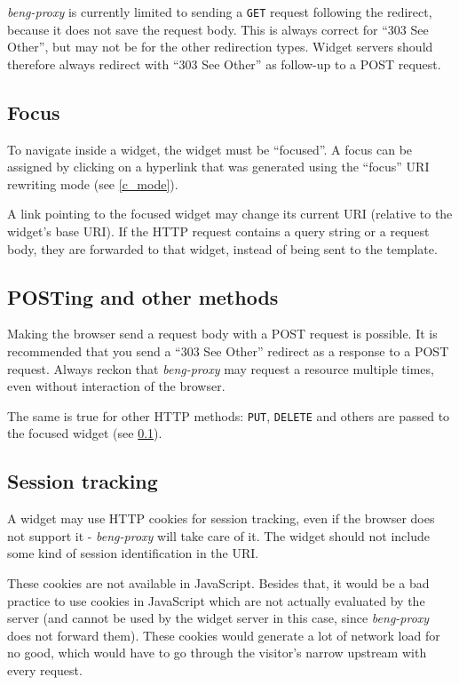 \documentclass[a4paper,12pt]{article}
\begin{document}
\emph{beng-proxy} is currently limited to sending a \texttt{GET}
request following the redirect, because it does not save the request
body.  This is always correct for ``303 See Other'', but may not be
for the other redirection types.  Widget servers should therefore
always redirect with ``303 See Other'' as follow-up to a POST request.

\subsection{Focus}
\label{focus}

To navigate inside a widget, the widget must be ``focused''.  A focus
can be assigned by clicking on a hyperlink that was generated using
the ``focus'' URI rewriting mode (see \ref{c_mode}).

A link pointing to the focused widget may change its current URI
(relative to the widget's base URI).  If the HTTP request contains a
query string or a request body, they are forwarded to that widget,
instead of being sent to the template.

\subsection{POSTing and other methods}

Making the browser send a request body with a POST request is
possible.  It is recommended that you send a ``303 See Other''
redirect as a response to a POST request.  Always reckon that
\emph{beng-proxy} may request a resource multiple times, even without
interaction of the browser.

The same is true for other HTTP methods: \texttt{PUT}, \texttt{DELETE}
and others are passed to the focused widget (see \ref{focus}).

\subsection{Session tracking}

A widget may use HTTP cookies for session tracking, even if the
browser does not support it - \emph{beng-proxy} will take care of it.
The widget should not include some kind of session identification in
the URI.

These cookies are not available in JavaScript.  Besides that, it would
be a bad practice to use cookies in JavaScript which are not actually
evaluated by the server (and cannot be used by the widget server in
this case, since \emph{beng-proxy} does not forward them).  These
cookies would generate a lot of network load for no good, which would
have to go through the visitor's narrow upstream with every request.
\end{document}
